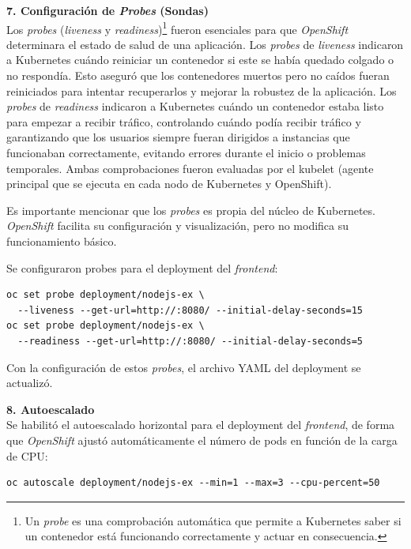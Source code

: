 \vspace{0.5cm}
\noindent\textbf{7. Configuración de \textit{Probes} (Sondas)} \\
Los \textit{probes} (\textit{liveness} y \textit{readiness})\footnote{Un \textit{probe} es una comprobación automática que permite a Kubernetes saber si un contenedor está funcionando correctamente y actuar en consecuencia.} fueron esenciales para que \textit{OpenShift} determinara el estado de salud de una aplicación. Los \textit{probes} de \textit{liveness} indicaron a Kubernetes cuándo reiniciar un contenedor si este se había quedado colgado o no respondía. Esto aseguró que los contenedores muertos pero no caídos fueran reiniciados para intentar recuperarlos y mejorar la robustez de la aplicación. Los \textit{probes} de \textit{readiness} indicaron a Kubernetes cuándo un contenedor estaba listo para empezar a recibir tráfico, controlando cuándo podía recibir tráfico y garantizando que los usuarios siempre fueran dirigidos a instancias que funcionaban correctamente, evitando errores durante el inicio o problemas temporales. Ambas comprobaciones fueron evaluadas por el kubelet (agente principal que se ejecuta en cada nodo de Kubernetes y OpenShift).

Es importante mencionar que los \textit{probes} es propia del núcleo de Kubernetes. \textit{OpenShift} facilita su configuración y visualización, pero no modifica su funcionamiento básico.

     Se configuraron probes para el deployment del \textit{frontend}:
    \begin{verbatim}
oc set probe deployment/nodejs-ex \
  --liveness --get-url=http://:8080/ --initial-delay-seconds=15
oc set probe deployment/nodejs-ex \
  --readiness --get-url=http://:8080/ --initial-delay-seconds=5
    \end{verbatim}

    Con la configuración de estos \textit{probes}, el archivo YAML del deployment se actualizó.

\vspace{0.5cm}
\noindent\textbf{8. Autoescalado} \\
    Se habilitó el autoescalado horizontal para el deployment del \textit{frontend}, de forma que \textit{OpenShift} ajustó automáticamente el número de pods en función de la carga de CPU: 
    \begin{verbatim}
oc autoscale deployment/nodejs-ex --min=1 --max=3 --cpu-percent=50
    \end{verbatim}

